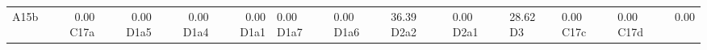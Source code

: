 \begin{tabular}{lrrrr}
A15b & 0.00%
C17a & 0.00%
D1a5 & 0.00%
D1a4 & 0.00%
D1a1 & 0.00%
D1a7 & 0.00%
D1a6 & 36.39%
D2a2 & 0.00%
D2a1 & 28.62%
D3 & 0.00%
C17c & 0.00%
C17d & 0.00%
\bottomrule
\end{tabular}
